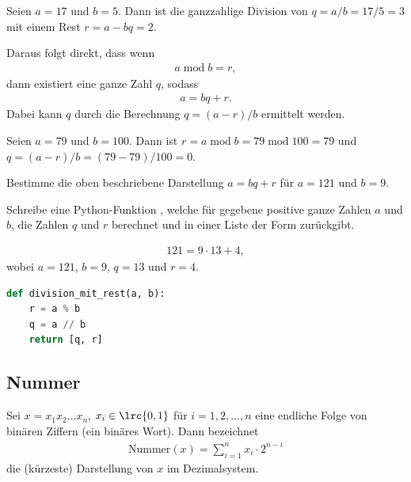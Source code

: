 \begin{myexample}
Seien $a = 17$ und $b = 5$. Dann ist die ganzzahlige Division von $ q = a / b = 17 / 5 = 3$ mit einem Rest $r = a - bq=2$.
\end{myexample}
Daraus folgt direkt, dass wenn
\begin{align}
	a\; \text{mod}\; b = r,
\end{align}
dann existiert eine ganze Zahl $q$, sodass
\begin{align}
	a = bq + r.
\end{align}
Dabei kann $q$ durch die Berechnung $q = (a - r) / b$ ermittelt werden.

\begin{myexample}
Seien $a = 79$ und $b = 100$. Dann ist  $r = a\; \text{mod}\; b = 79\; \text{mod}\; 100 = 79$ und $q = (a-r) / b = (79 - 79) / 100 = 0$.
\end{myexample}

\begin{myexercise}
	\begin{aenum}
		\item Bestimme die oben beschriebene Darstellung $a = bq + r$ für $a = 121$ und $b = 9$.
		\item Schreibe eine Python-Funktion , welche für gegebene positive ganze Zahlen $a$ und $b$, die Zahlen $q$ und $r$ berechnet und in einer Liste der Form \pythoninline{[q, r]} zurückgibt.
	\end{aenum}
	\begin{myanswer}
		\begin{aenum}
			\item \begin{align*}
				121 = 9\cdot 13 + 4,
			\end{align*}
			wobei $a = 121$, $b = 9$, $q = 13$ und $r = 4$.
			\item \phantom{1}
			\begin{lstlisting}[language=Python,caption=Division mit Rest,numbers=none]
def division_mit_rest(a, b):
    r = a % b
    q = a // b
    return [q, r]
\end{lstlisting}
		\end{aenum}
	\end{myanswer}
\end{myexercise}

\subsection{Nummer}
Sei $x=x_1x_2\ldots x_n$, $x_i\in\lrc{0,1}$ für $i = 1,2,\ldots, n$ eine endliche Folge von binären Ziffern (ein binäres Wort). Dann bezeichnet
\begin{align}
	\text{Nummer}(x)=\displaystyle\sum_{i=1}^n x_i\cdot 2^{n-i}
\end{align}
die (kürzeste) Darstellung von $x$ im Dezimalsystem.

